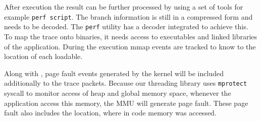 After execution the result can be further processed by using a set of tools
for example {\tt perf script}. The branch information is still in a compressed
form and needs to be decoded. The {\tt perf} utility has a decoder integrated to achieve this.
To map the trace onto binaries, it needs access to executables and linked
libraries of the application. During the execution mmap events are tracked to
know to the location of each loadable.




Along with \intelpt, page fault events generated by the kernel will be included
additionally to the trace packets. Because our threading library uses {\tt mprotect}
syscall to monitor access of heap and global memory space, whenever the
application access this memory, the MMU will generate page fault. These
page fault also includes the location, where in code memory was accessed.





